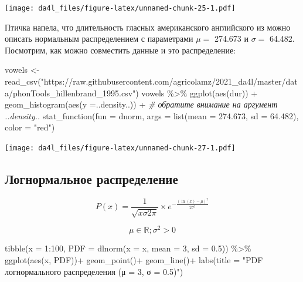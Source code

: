 \documentclass[
]{book}
\newenvironment{Shaded}{\begin{snugshade}}{\end{snugshade}}
\newcommand{\AttributeTok}[1]{\textcolor[rgb]{0.77,0.63,0.00}{#1}}
\newcommand{\CommentTok}[1]{\textcolor[rgb]{0.56,0.35,0.01}{\textit{#1}}}
\newcommand{\DecValTok}[1]{\textcolor[rgb]{0.00,0.00,0.81}{#1}}
\newcommand{\FloatTok}[1]{\textcolor[rgb]{0.00,0.00,0.81}{#1}}
\newcommand{\FunctionTok}[1]{\textcolor[rgb]{0.00,0.00,0.00}{#1}}
\newcommand{\NormalTok}[1]{#1}
\newcommand{\OtherTok}[1]{\textcolor[rgb]{0.56,0.35,0.01}{#1}}
\newcommand{\SpecialCharTok}[1]{\textcolor[rgb]{0.00,0.00,0.00}{#1}}
\newcommand{\StringTok}[1]{\textcolor[rgb]{0.31,0.60,0.02}{#1}}
\begin{document}
\texttt{[image: da4l\_files/figure-latex/unnamed-chunk-25-1.pdf]}

Птичка напела, что длительность гласных американского английского из \citep{hillenbrand95} можно описать нормальным распределением с параметрами \(\mu =\) 274.673 и \(\sigma =\) 64.482. Посмотрим, как можно совместить данные и это распределение:

\begin{Shaded}
\begin{Highlighting}[]
\NormalTok{vowels }\OtherTok{\textless{}{-}} \FunctionTok{read\_csv}\NormalTok{(}\StringTok{"https://raw.githubusercontent.com/agricolamz/2021\_da4l/master/data/phonTools\_hillenbrand\_1995.csv"}\NormalTok{) }
\NormalTok{vowels }\SpecialCharTok{\%\textgreater{}\%} 
  \FunctionTok{ggplot}\NormalTok{(}\FunctionTok{aes}\NormalTok{(dur)) }\SpecialCharTok{+} 
  \FunctionTok{geom\_histogram}\NormalTok{(}\FunctionTok{aes}\NormalTok{(}\AttributeTok{y =}\NormalTok{..density..)) }\SpecialCharTok{+} \CommentTok{\# обратите внимание на аргумент ..density..}
  \FunctionTok{stat\_function}\NormalTok{(}\AttributeTok{fun =}\NormalTok{ dnorm, }\AttributeTok{args =} \FunctionTok{list}\NormalTok{(}\AttributeTok{mean =} \FloatTok{274.673}\NormalTok{, }\AttributeTok{sd =} \FloatTok{64.482}\NormalTok{), }\AttributeTok{color =} \StringTok{"red"}\NormalTok{)}
\end{Highlighting}
\end{Shaded}

\texttt{[image: da4l\_files/figure-latex/unnamed-chunk-27-1.pdf]}

\hypertarget{ux43bux43eux433ux43dux43eux440ux43cux430ux43bux44cux43dux43eux435-ux440ux430ux441ux43fux440ux435ux434ux435ux43bux435ux43dux438ux435}{%
\subsection{Логнормальное распределение}\label{ux43bux43eux433ux43dux43eux440ux43cux430ux43bux44cux43dux43eux435-ux440ux430ux441ux43fux440ux435ux434ux435ux43bux435ux43dux438ux435}}

\[P(x) = \frac{1}{\sqrt{x\sigma2\pi}}\times e^{-\frac{\left(\ln(x)-\mu\right)^2}{2\sigma^2}}\]

\[\mu \in \mathbb{R}; \sigma^2 > 0\]

\begin{Shaded}
\begin{Highlighting}[]
\FunctionTok{tibble}\NormalTok{(}\AttributeTok{x =} \DecValTok{1}\SpecialCharTok{:}\DecValTok{100}\NormalTok{,}
       \AttributeTok{PDF =} \FunctionTok{dlnorm}\NormalTok{(}\AttributeTok{x =}\NormalTok{ x, }\AttributeTok{mean =} \DecValTok{3}\NormalTok{, }\AttributeTok{sd =} \FloatTok{0.5}\NormalTok{)) }\SpecialCharTok{\%\textgreater{}\%} 
  \FunctionTok{ggplot}\NormalTok{(}\FunctionTok{aes}\NormalTok{(x, PDF))}\SpecialCharTok{+}
  \FunctionTok{geom\_point}\NormalTok{()}\SpecialCharTok{+}
  \FunctionTok{geom\_line}\NormalTok{()}\SpecialCharTok{+}
  \FunctionTok{labs}\NormalTok{(}\AttributeTok{title =} \StringTok{"PDF логнормального распределения (μ = 3, σ = 0.5)"}\NormalTok{)}
\end{Highlighting}
\end{Shaded}
\end{document}
